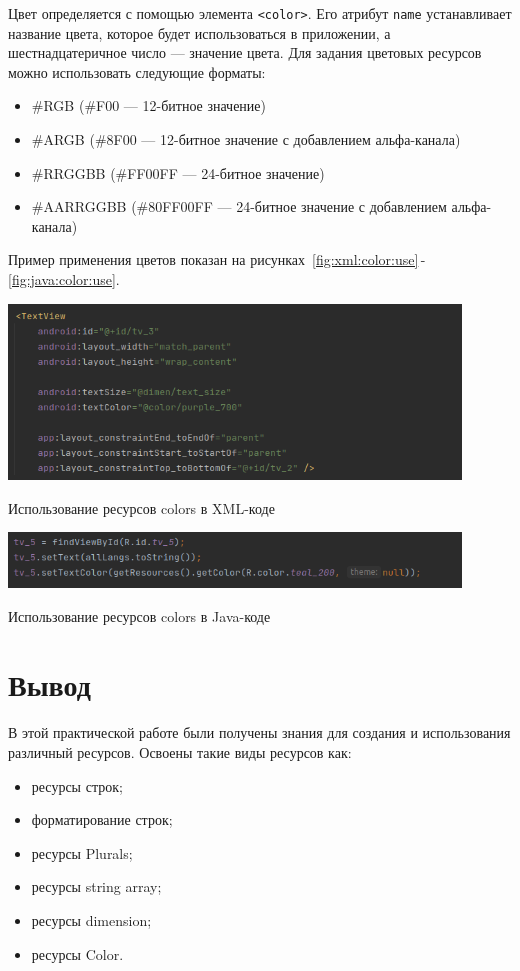 Цвет определяется с помощью элемента \texttt{<color>}. Его атрибут
\texttt{name} устанавливает название цвета, которое будет использоваться
в приложении, а шестнадцатеричное число --- значение цвета.
Для задания цветовых ресурсов можно использовать следующие форматы:

\begin{itemize}
	\item \#RGB (\#F00 --- 12-битное значение)
	\item \#ARGB (\#8F00 --- 12-битное значение с добавлением альфа-канала)
	\item \#RRGGBB (\#FF00FF --- 24-битное значение)
	\item \#AARRGGBB (\#80FF00FF --- 24-битное значение с добавлением
		альфа-канала)
\end{itemize}

Пример применения цветов показан на
рисунках~\ref{fig:xml:color:use}\,-\,\ref{fig:java:color:use}.

\begin{image}
	\includegraphics[width=0.9\textwidth]{Screenshot from 2023-03-30 19-31-39}
	\caption{Использование ресурсов colors в XML-коде}
	\label{fig:xml:color:use}
\end{image}

\begin{image}
	\includegraphics[width=0.9\textwidth]{Screenshot from 2023-03-30 19-40-51}
	\caption{Использование ресурсов colors в Java-коде}
	\label{fig:java:color:use}
\end{image}

\clearpage

\section*{\LARGE{Вывод}}
В этой практической работе были получены знания для создания и
использования различный ресурсов. Освоены такие виды ресурсов как:

\begin{itemize}
	\item ресурсы строк;
	\item форматирование строк;
	\item ресурсы Plurals;
	\item ресурсы string array;
	\item ресурсы dimension;
	\item ресурсы Color.
\end{itemize}


